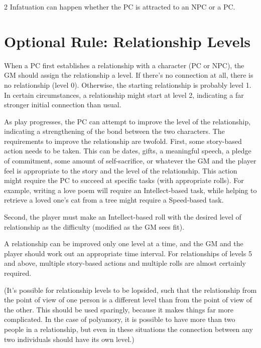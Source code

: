 \begin{multicols}{2}
Infatuation can happen whether the PC is attracted to an NPC or a PC.

\section{Optional Rule: Relationship Levels}

When a PC first establishes a relationship with a character (PC or NPC), the GM should assign the relationship a level. If there’s no connection at all, there is no relationship (level 0). Otherwise, the starting relationship is probably level 1. In certain circumstances, a relationship might start at level 2, indicating a far stronger initial connection than usual.

As play progresses, the PC can attempt to improve the level of the relationship, indicating a strengthening of the bond between the two characters. The requirements to improve the relationship are twofold. First, some story-based action needs to be taken. This can be dates, gifts, a meaningful speech, a pledge of commitment, some amount of self-sacrifice, or whatever the GM and the player feel is appropriate to the story and the level of the relationship. This action might require the PC to succeed at specific tasks (with appropriate rolls). For example, writing a love poem will require an Intellect-based task, while helping to retrieve a loved one’s cat from a tree might require a Speed-based task.

Second, the player must make an Intellect-based roll with the desired level of relationship as the difficulty (modified as the GM sees fit).

A relationship can be improved only one level at a time, and the GM and the player should work out an appropriate time interval. For relationships of levels 5 and above, multiple story-based actions and multiple rolls are almost certainly required. 

(It’s possible for relationship levels to be lopsided, such that the relationship from the point of view of one person is a different level than from the point of view of the other. This should be used sparingly, because it makes things far more complicated. In the case of polyamory, it is possible to have more than two people in a relationship, but even in these situations the connection between any two individuals should have its own level.)
  
\end{multicols}

